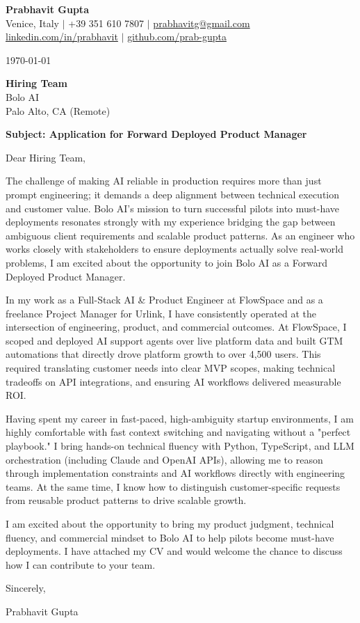 \documentclass[11pt,a4paper]{article}
\begin{document}
\begin{center}
{\LARGE \textbf{Prabhavit Gupta}}\\[0.5em]
Venice, Italy $\vert$ +39 351 610 7807 $\vert$ \href{mailto:prabhavitg@gmail.com}{prabhavitg@gmail.com}\\
\href{https://www.linkedin.com/in/prabhavit/}{linkedin.com/in/prabhavit} $\vert$ \href{https://github.com/prab-gupta}{github.com/prab-gupta}
\end{center}

\vspace{2em}

\today

\textbf{Hiring Team}\\
Bolo AI\\
Palo Alto, CA (Remote)

\textbf{Subject: Application for Forward Deployed Product Manager}

Dear Hiring Team,

The challenge of making AI reliable in production requires more than just prompt engineering; it demands a deep alignment between technical execution and customer value. Bolo AI's mission to turn successful pilots into must-have deployments resonates strongly with my experience bridging the gap between ambiguous client requirements and scalable product patterns. As an engineer who works closely with stakeholders to ensure deployments actually solve real-world problems, I am excited about the opportunity to join Bolo AI as a Forward Deployed Product Manager.

In my work as a Full-Stack AI \& Product Engineer at FlowSpace and as a freelance Project Manager for Urlink, I have consistently operated at the intersection of engineering, product, and commercial outcomes. At FlowSpace, I scoped and deployed AI support agents over live platform data and built GTM automations that directly drove platform growth to over 4,500 users. This required translating customer needs into clear MVP scopes, making technical tradeoffs on API integrations, and ensuring AI workflows delivered measurable ROI. 

Having spent my career in fast-paced, high-ambiguity startup environments, I am highly comfortable with fast context switching and navigating without a "perfect playbook." I bring hands-on technical fluency with Python, TypeScript, and LLM orchestration (including Claude and OpenAI APIs), allowing me to reason through implementation constraints and AI workflows directly with engineering teams. At the same time, I know how to distinguish customer-specific requests from reusable product patterns to drive scalable growth.

I am excited about the opportunity to bring my product judgment, technical fluency, and commercial mindset to Bolo AI to help pilots become must-have deployments. I have attached my CV and would welcome the chance to discuss how I can contribute to your team.

Sincerely,

Prabhavit Gupta
\end{document}
